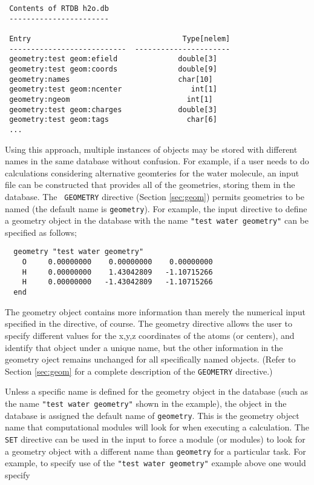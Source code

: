 \begin{verbatim}
 Contents of RTDB h2o.db
 -----------------------

 Entry                                   Type[nelem]
 ---------------------------  ----------------------
 geometry:test geom:efield              double[3]    
 geometry:test geom:coords              double[9]    
 geometry:names                         char[10]   
 geometry:test geom:ncenter                int[1]    
 geometry:ngeom                           int[1]    
 geometry:test geom:charges             double[3]    
 geometry:test geom:tags                  char[6]
 ...
\end{verbatim}

Using this approach, multiple instances of objects may be stored with
different names in the same database without confusion.  For example,
if a user needs to do calculations considering alternative geomteries
for the water molecule, an input file can be constructed that provides
all of the geometries, storing them in the database.  The {\tt
  GEOMETRY} directive (Section \ref{sec:geom}) permits geometries to
be named (the default name is \verb+geometry+).  For example, the
input directive to define a geometry object in the database with the
name \verb+"test water geometry"+ can be specified as follows;

\begin{verbatim}
  geometry "test water geometry"
    O     0.00000000    0.00000000    0.00000000
    H     0.00000000    1.43042809   -1.10715266
    H     0.00000000   -1.43042809   -1.10715266
  end
\end{verbatim}

The geometry object contains more information than merely the
numerical input specified in the directive, of course.  The geometry
directive allows the user to specify different values for the x,y,z
coordinates of the atoms (or centers), and identify that object under
a unique name, but the other information in the geometry oject remains
unchanged for all specifically named objects.  (Refer to Section
\ref{sec:geom} for a complete description of the {\tt GEOMETRY}
directive.)

Unless a specific name is defined for the geometry object in the
database (such as the name \verb+"test water geometry"+ shown in the
example), the object in the database is assigned the default name of
\verb+geometry+.  This is the geometry object name that computational
modules will look for when executing a calculation.  The {\tt SET}
directive can be used in the input to force a module (or modules) to
look for a geometry object with a different name than \verb+geometry+
for a particular task.  For example, to specify use of the 
\verb+"test water geometry"+ example above one would specify

